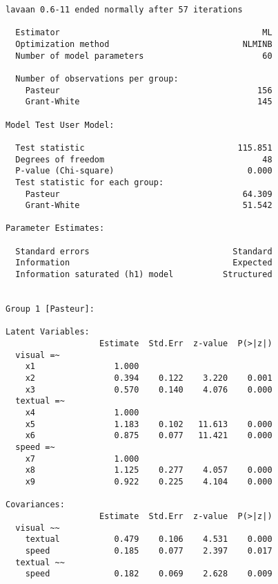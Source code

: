 \begin{verbatim}
lavaan 0.6-11 ended normally after 57 iterations

  Estimator                                         ML
  Optimization method                           NLMINB
  Number of model parameters                        60
                                                      
  Number of observations per group:                   
    Pasteur                                        156
    Grant-White                                    145
                                                      
Model Test User Model:
                                                      
  Test statistic                               115.851
  Degrees of freedom                                48
  P-value (Chi-square)                           0.000
  Test statistic for each group:
    Pasteur                                     64.309
    Grant-White                                 51.542

Parameter Estimates:

  Standard errors                             Standard
  Information                                 Expected
  Information saturated (h1) model          Structured


Group 1 [Pasteur]:

Latent Variables:
                   Estimate  Std.Err  z-value  P(>|z|)
  visual =~                                           
    x1                1.000                           
    x2                0.394    0.122    3.220    0.001
    x3                0.570    0.140    4.076    0.000
  textual =~                                          
    x4                1.000                           
    x5                1.183    0.102   11.613    0.000
    x6                0.875    0.077   11.421    0.000
  speed =~                                            
    x7                1.000                           
    x8                1.125    0.277    4.057    0.000
    x9                0.922    0.225    4.104    0.000

Covariances:
                   Estimate  Std.Err  z-value  P(>|z|)
  visual ~~                                           
    textual           0.479    0.106    4.531    0.000
    speed             0.185    0.077    2.397    0.017
  textual ~~                                          
    speed             0.182    0.069    2.628    0.009


\end{verbatim}
